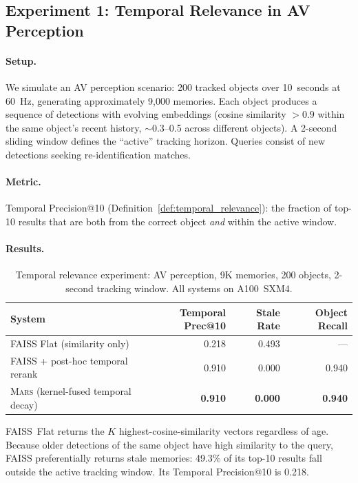 \documentclass[11pt]{article}
\newcommand{\mars}{\textsc{Mars}}
\begin{document}
\subsection{Experiment 1: Temporal Relevance in AV Perception}
\label{sec:temporal_relevance}

\paragraph{Setup.} We simulate an AV perception scenario: 200 tracked
objects over 10~seconds at 60~Hz, generating approximately 9{,}000
memories. Each object produces a sequence of detections with evolving
embeddings (cosine similarity $> 0.9$ within the same object's recent
history, $\sim$0.3--0.5 across different objects). A 2-second sliding
window defines the ``active'' tracking horizon. Queries consist of new
detections seeking re-identification matches.

\paragraph{Metric.} Temporal Precision@10
(Definition~\ref{def:temporal_relevance}): the fraction of top-10
results that are both from the correct object \emph{and} within the
active window.

\paragraph{Results.}

\begin{table}[ht]
\centering
\small
\caption{Temporal relevance experiment: AV perception, 9K memories, 200
objects, 2-second tracking window. All systems on A100~SXM4.}
\label{tab:temporal}
\begin{tabular}{lrrr}
\toprule
\textbf{System} & \textbf{Temporal Prec@10} & \textbf{Stale Rate} & \textbf{Object Recall} \\
\midrule
FAISS Flat (similarity only)        & 0.218 & 0.493 & --- \\
FAISS + post-hoc temporal rerank    & 0.910 & 0.000 & 0.940 \\
\mars{} (kernel-fused temporal decay) & \textbf{0.910} & \textbf{0.000} & \textbf{0.940} \\
\bottomrule
\end{tabular}
\end{table}

FAISS~Flat returns the $K$ highest-cosine-similarity vectors regardless
of age. Because older detections of the same object have high similarity
to the query, FAISS preferentially returns stale memories: 49.3\% of its
top-10 results fall outside the active tracking window. Its Temporal
Precision@10 is 0.218.
\end{document}
